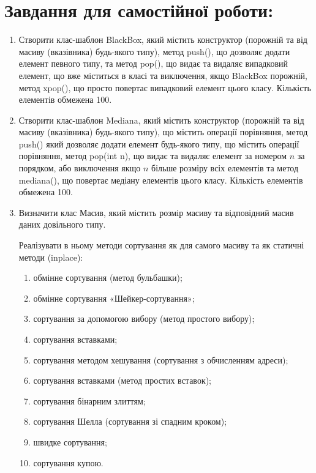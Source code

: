\documentclass[a5paper,titlepage,openany,twoside,
]
{book_unv}%
\makeatletter
\newcommand{\xslalph}[1]{\expandafter\@xslalph\csname c@#1\endcsname}
\newcommand{\@xslalph}[1]{%
    \ifcase#1\or а\or б\or в\or г\or д\or e\or є\or ж\or з\or i%
    \or й\or к\or л\or м\or н\or о\or п\or р\or с\or т%
    \or у\or ф\or х\or ц\or ч\or ш\or ю\or я\or аа\or бб\or вв%
    \else\@ctrerr\fi%
}
\makeatother
\begin{document}
\section{Завдання для самостійної роботи:}

\begin{enumerate}
\def\labelenumi{\arabic{enumi})}
\setcounter{enumi}{2}
\item
  Створити клас-шаблон BlackBox, який містить конструктор
  (порожній та від масиву (вказівника) будь-якого типу), метод push(),
  що дозволяє додати елемент певного типу, та метод pop(), що видає та
  видаляє випадковий елемент, що вже міститься в класі та виключення,
  якщо BlackBox порожній, метод xpop(), що просто повертає випадковий
  елемент цього класу. Кількість елементів обмежена 100.
\item
  Створити клас-шаблон Mediana, який містить конструктор (порожній та
  від масиву (вказівника) будь-якого типу), що містить операції
  порівняння, метод push() який дозволяє додати елемент будь-якого типу,
  що містить операції порівняння, метод pop(int n), що видає та
  видаляє елемент за номером $n$ за порядком, або виключення якщо $n$ більше
  розміру всіх елементів та метод mediana(), що повертає медіану елементів
  цього класу. Кількість елементів обмежена 100.
\item
Визначити клас Масив, який містить розмір масиву та
відповідний масив даних довільного типу.

Реалізувати в ньому методи сортування як для самого масиву та як статичні методи (inplace):
\begin{enumerate}[label=\xslalph*)]
\item
обмінне сортування (метод бульбашки);
\item
обмінне сортування «Шейкер-сортування»;
\item
сортування за допомогою вибору (метод простого вибору);
\item
сортування вставками;
\item
сортування методом хешування (сортування з обчисленням адреси);
\item
сортування вставками (метод простих вставок);
\item
сортування бінарним злиттям;
\item
сортування Шелла (сортування зі спадним кроком);
\item
швидке сортування;
\item
сортування купою.
\end{enumerate}


\end{enumerate}
\end{document}
